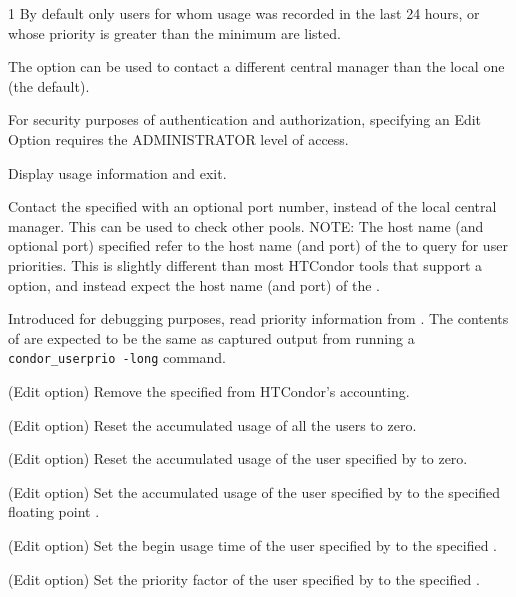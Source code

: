 \begin{ManPage}{\label{man-condor-userprio}}{1}
By default only users for whom usage was recorded in the last 24 hours, 
or whose priority is greater than the minimum are listed.

The  option can be used to contact a different central manager 
than the local one (the default).


For security purposes of authentication and authorization,
specifying an Edit Option requires the ADMINISTRATOR level of access.

\begin{Options}

  {Display usage information and exit.}

  {Contact the specified  with an
  optional port number, instead of the local central manager. 
  This can be used to check other pools.  
  NOTE: The host name (and optional port) specified refer to the host name
  (and port) of the  to query for user priorities.
  This is slightly different than most HTCondor tools
  that support a  option,
  and instead expect the host name (and port) of the .}

  {Introduced for debugging purposes,
   read priority information from .
   The contents of  are expected to be the same as captured
   output from running a \texttt{condor\_userprio -long} command.}

  {(Edit option) Remove the specified  from HTCondor's accounting.}

  {(Edit option) Reset the accumulated usage of all the users to zero.}

  {(Edit option) Reset the accumulated usage of the user specified by
   to zero. }

  {(Edit option) Set the accumulated usage of the user specified by
   to the specified floating point . }

  {(Edit option) Set the begin usage time of the user specified by
   to the specified . }

  {(Edit option) Set the priority factor of the user specified by
   to the specified .  }


\end{Options}
\end{ManPage}
